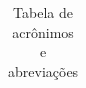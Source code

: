 \documentclass{report}
\begin{document}
\begin{center}
\begin{longtable}[pos]{|m{52pt} | m{350pt}|}
\caption{Tabela de acrônimos e abreviações}
\end{longtable}
\end{center}

\end{document}
